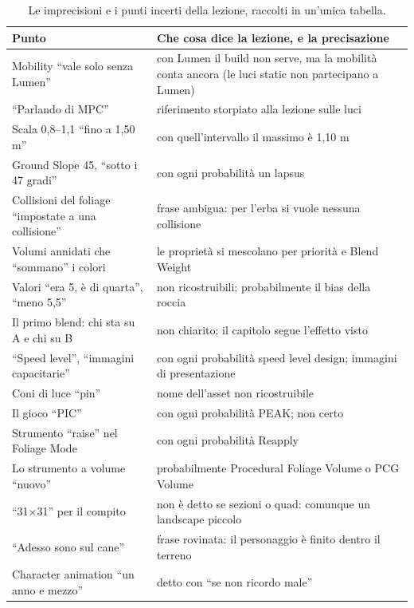 \begin{table}[htbp]
\centering
\small
\begin{tabular}{@{}p{4.6cm}p{9.4cm}@{}}
\toprule
\textbf{Punto} & \textbf{Che cosa dice la lezione, e la precisazione} \\
\midrule
Mobility ``vale solo senza Lumen'' & con Lumen il build non serve, ma la mobilità conta
ancora (le luci static non partecipano a Lumen) \\
``Parlando di MPC'' & riferimento storpiato alla lezione sulle luci \\
Scala 0,8--1,1 ``fino a 1,50 m'' & con quell'intervallo il massimo è 1,10 m \\
Ground Slope 45, ``sotto i 47 gradi'' & con ogni probabilità un lapsus \\
Collisioni del foliage ``impostate a una collisione'' & frase ambigua: per l'erba si vuole
nessuna collisione \\
Volumi annidati che ``sommano'' i colori & le proprietà si mescolano per priorità e Blend
Weight \\
Valori ``era 5, è di quarta'', ``meno 5,5'' & non ricostruibili; probabilmente il bias
della roccia \\
Il primo blend: chi sta su A e chi su B & non chiarito; il capitolo segue l'effetto visto \\
``Speed level'', ``immagini capacitarie'' & con ogni probabilità speed level design;
immagini di presentazione \\
Coni di luce ``pin'' & nome dell'asset non ricostruibile \\
Il gioco ``PIC'' & con ogni probabilità PEAK; non certo \\
Strumento ``raise'' nel Foliage Mode & con ogni probabilità Reapply \\
Lo strumento a volume ``nuovo'' & probabilmente Procedural Foliage Volume o PCG Volume \\
``31$\times$31'' per il compito & non è detto se sezioni o quad: comunque un landscape
piccolo \\
``Adesso sono sul cane'' & frase rovinata: il personaggio è finito dentro il terreno \\
Character animation ``un anno e mezzo'' & detto con ``se non ricordo male'' \\
\bottomrule
\end{tabular}
\caption{Le imprecisioni e i punti incerti della lezione, raccolti in un'unica tabella.}
\label{ue15:tab:imprecisioni}
\end{table}

